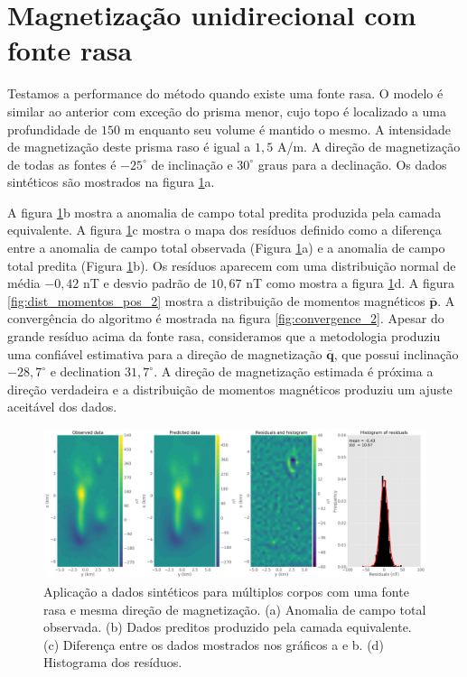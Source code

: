 \section{Magnetização unidirecional com fonte rasa}
\label{sec:unidir_shallow}

Testamos a performance do método quando existe uma fonte rasa. O modelo é similar ao anterior com exceção do prisma menor, cujo topo é localizado a uma profundidade de $150$ m enquanto seu volume é mantido o mesmo. A intensidade de magnetização deste prisma raso é igual a $1,5$ A/m. A direção de magnetização de todas as fontes é $-25^\circ$ de inclinação e $30^\circ$ graus para a declinação. Os dados sintéticos são mostrados na figura \ref{fig:data_fitting_2}a.

A figura \ref{fig:data_fitting_2}b mostra a anomalia de campo total predita produzida pela camada equivalente. A figura \ref{fig:data_fitting_2}c mostra o mapa dos resíduos definido como a diferença entre a anomalia de campo total observada (Figura \ref{fig:data_fitting_2}a) e a anomalia de campo total predita (Figura \ref{fig:data_fitting_2}b). Os resíduos aparecem com uma distribuição normal de média $-0,42$ nT e desvio padrão de $10,67$ nT como mostra a figura \ref{fig:data_fitting_2}d. A figura \ref{fig:dist_momentos_pos_2} mostra a distribuição de momentos magnéticos $\bar{\mathbf{p}}$. A convergência do algoritmo é mostrada na figura \ref{fig:convergence_2}. Apesar do grande resíduo acima da fonte rasa, consideramos que a metodologia produziu uma confiável estimativa para a direção de magnetização $\bar{\mathbf{q}}$, que possui inclinação $-28,7^\circ$ e declination $31,7^\circ$. A direção de magnetização estimada é próxima a direção verdadeira e a distribuição de momentos magnéticos produziu um ajuste aceitável dos dados. 

\begin{figure}
	\centering
	\includegraphics[width=1.1\textwidth]{Fig/eqlayer/unidir_shallow_test/data_fitting_LM_NNLS_magRM.png}
	\caption{Aplicação a dados sintéticos para múltiplos corpos com uma fonte rasa e mesma direção de magnetização. (a) Anomalia de campo total observada. (b) Dados preditos produzido pela camada equivalente. (c) Diferença entre os dados mostrados nos gráficos a e b. (d) Histograma dos resíduos.}
	\label{fig:data_fitting_2}
\end{figure}

